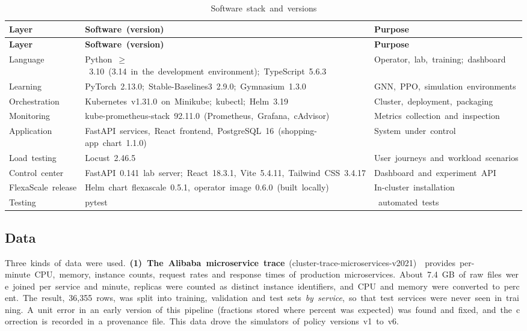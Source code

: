 \documentclass[12pt,a4paper,oneside]{report}
\begin{document}
\begingroup\small\setlength{\tabcolsep}{4pt}\renewcommand{\arraystretch}{1.25}
\begin{longtable}{|>{\raggedright\arraybackslash}p{2.47cm}|>{\raggedright\arraybackslash}p{6.98cm}|>{\raggedright\arraybackslash}p{5.09cm}|}
\caption{Software~stack~and~versions}\label{tab:sw}\\\hline
\textbf{Layer} & \textbf{Software~(version)} & \textbf{Purpose}\\\hline\endfirsthead
\hline \textbf{Layer} & \textbf{Software~(version)} & \textbf{Purpose}\\\hline\endhead
Language & Python~$\ge$~3.10~(3.14~in~the~development~environment);~TypeScript~5.6.3 & Operator,~lab,~training;~dashboard\\\hline
Learning & PyTorch~2.13.0;~Stable-Baselines3~2.9.0;~Gymnasium~1.3.0 & GNN,~PPO,~simulation~environments\\\hline
Orchestration & Kubernetes~v1.31.0~on~Minikube;~kubectl;~Helm~3.19 & Cluster,~deployment,~packaging\\\hline
Monitoring & kube-prometheus-stack~92.11.0~(Prometheus,~Grafana,~cAdvisor) & Metrics~collection~and~inspection\\\hline
Application & FastAPI~services,~React~frontend,~PostgreSQL~16~(shopping-app~chart~1.1.0) & System~under~control\\\hline
Load~testing & Locust~2.46.5 & User~journeys~and~workload~scenarios\\\hline
Control~center & FastAPI~0.141~lab~server;~React~18.3.1,~Vite~5.4.11,~Tailwind~CSS~3.4.17 & Dashboard~and~experiment~API\\\hline
FlexaScale~release & Helm~chart~flexascale~0.5.1,~operator~image~0.6.0~(built~locally) & In-cluster~installation\\\hline
Testing & pytest & 373~automated~tests\\\hline
\end{longtable}\endgroup

\subsection{Data}

Three~kinds~of~data~were~used.~\textbf{(1)~The~Alibaba~microservice~trace}~(cluster-trace-microservices-v2021)~\cite{alibaba,alibabadata}~provides~per-minute~CPU,~memory,~instance~counts,~request~rates~and~response~times~of~production~microservices.~About~7.4~GB~of~raw~files~were~joined~per~service~and~minute,~replicas~were~counted~as~distinct~instance~identifiers,~and~CPU~and~memory~were~converted~to~percent.~The~result,~36,355~rows,~was~split~into~training,~validation~and~test~sets~\textit{by~service},~so~that~test~services~were~never~seen~in~training.~A~unit~error~in~an~early~version~of~this~pipeline~(fractions~stored~where~percent~was~expected)~was~found~and~fixed,~and~the~correction~is~recorded~in~a~provenance~file.~This~data~drove~the~simulators~of~policy~versions~v1~to~v6.
\end{document}
